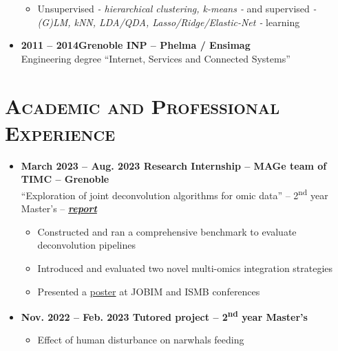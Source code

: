 \documentclass{article}
\begin{document}
\begin{minipage}{0.8\textwidth}
\begin{flushleft}
\begin{itemize}
\begin{itemize}[leftmargin=*]
            \item Unsupervised \textit{- hierarchical clustering, k-means -} and supervised \textit{- (G)LM, kNN, LDA/QDA, Lasso/Ridge/Elastic-Net -} learning
        \end{itemize}
        \item \textbf{2011 – 2014\qquad \qquad \qquad \qquad Grenoble INP – Phelma / Ensimag} \\
        Engineering degree “Internet, Services and Connected Systems”
    \end{itemize}
    \section*{\textsc{Academic and Professional Experience}}
    \begin{itemize}
        \item \textbf{March 2023 – Aug. 2023 \quad Research Internship – MAGe team of TIMC – Grenoble} \\
        “Exploration of joint deconvolution algorithms for omic data” – 2\textsuperscript{nd} year Master’s – \textbf{\textit{ \href{https://vadmbertr.github.io/Exploration-of-joint-deconvolution-algorithms-for-omic-data/M2_Internship_report__Exploration_of_joint_deconvolution_algorithms_for_omic_data.pdf}{report}}}
        \vspace{-.15cm}
        \begin{itemize}[leftmargin=*]
        \setlength\itemsep{.01cm}
            \item Constructed and ran a comprehensive benchmark to evaluate deconvolution pipelines
            \item Introduced and evaluated two novel multi-omics integration strategies
            \item Presented a \href{https://vadmbertr.github.io/Exploration-of-joint-deconvolution-algorithms-for-omic-data/poster_jobim_ismb.pdf}{poster} at JOBIM and ISMB conferences
        \end{itemize}
        \item \textbf{Nov. 2022 – Feb. 2023 \qquad Tutored project – 2\textsuperscript{nd} year Master’s}
        \vspace{-.15cm}
        \begin{itemize}[leftmargin=*]
        \setlength\itemsep{.01cm}
            \item Effect of human disturbance on narwhals feeding
            \vspace{-.15cm}
            \begin{itemize}[leftmargin=*]

\end{itemize}
\end{itemize}
\end{itemize}
\end{flushleft}
\end{minipage}
\end{document}
